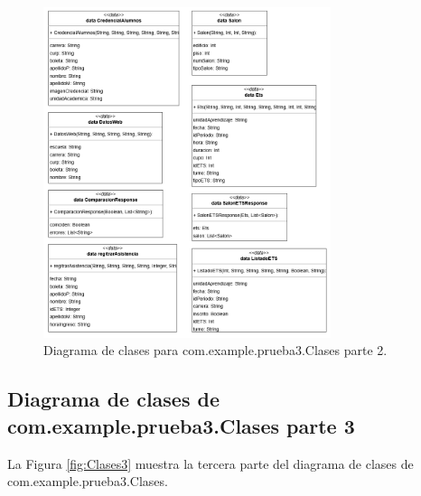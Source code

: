 \begin{figure}[htbp!]
	\begin{center}
		\includegraphics[width=0.75\textwidth]{DiagramasMoviles/DCM (3)}
		\caption{Diagrama de clases para com.example.prueba3.Clases parte 2.}
		\label{fig:Clases2}
	\end{center}
\end{figure}

\newpage

\subsection{Diagrama de clases de com.example.prueba3.Clases parte 3}

La Figura \ref{fig:Clases3} muestra la tercera parte del diagrama de clases de com.example.prueba3.Clases.

